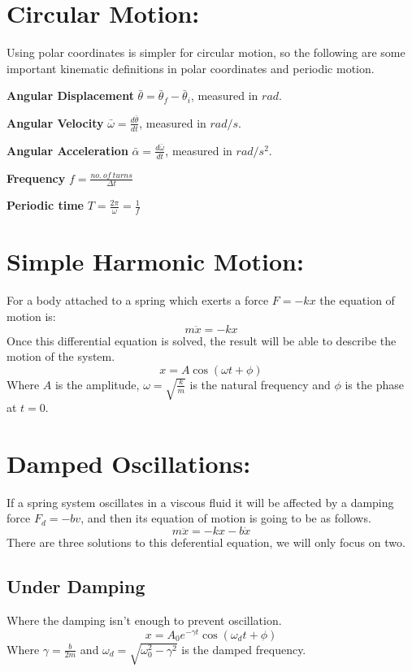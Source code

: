 \documentclass{article}
\begin{document}
\section{Circular Motion:}

Using polar coordinates is simpler for circular motion, so the following are some important kinematic definitions in polar coordinates and periodic motion.

\textbf{Angular Displacement} \quad $\bar\theta = \bar\theta_f - \bar\theta_i$, measured in $rad$.

\textbf{Angular Velocity} \quad $\bar\omega = \frac{d\bar\theta}{dt}$, measured in $rad/s$.

\textbf{Angular Acceleration} \quad $\bar\alpha = \frac{d\bar\omega}{dt}$, measured in $rad/s^2$.

\textbf{Frequency} \quad $f = \frac{no. \: of \: turns}{\Delta t}$

\textbf{Periodic time} $T = \frac{2\pi}{\omega}= \frac{1}f$

\section{Simple Harmonic Motion:}

For a body attached to a spring which exerts a force $F = -kx$ the equation of motion is:
$$m \ddot{x} = -kx$$
Once this differential equation is solved, the result will be able to describe the motion of the system.
$$x = A \cos(\omega t + \phi)$$
Where $A$ is the amplitude, $\omega = \sqrt{\frac{k}m}$ is the natural frequency and $\phi$ is the phase at $t = 0$.

\section{Damped Oscillations:}

If a spring system oscillates in a viscous fluid it will be affected by a damping force $F_d = -bv$, and then its equation of motion is going to be as follows.
$$m \ddot{x} = -kx - b \dot{x}$$
There are three solutions to this deferential equation, we will only focus on two.

\subsection{Under Damping}

Where the damping isn't enough to prevent oscillation.
$$x = A_0 e^{-\gamma t}\cos(\omega_d t + \phi)$$
Where $\gamma = \frac{b}{2m}$ and $\omega_d = \sqrt{\omega_0^2 - \gamma^2}$ is the damped frequency.
\end{document}
